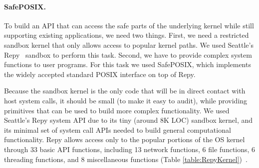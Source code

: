 \paragraph{SafePOSIX.}

To build an API that can access the safe parts of the underlying kernel while
still supporting existing applications, we need two things. First, we need a
restricted sandbox kernel that only allows access to popular kernel paths. We
used Seattle's Repy~\cite{Repy-10} sandbox to perform this task. Second, we
have to provide complex system functions to user programs.
For this task we used SafePOSIX, which implements the widely accepted standard
POSIX interface on top of Repy.

Because the sandbox kernel is the only code that will be in direct contact with host
system calls, it should be small (to make it easy to audit), while providing
primitives that can be used to build more complex functionality.
We used Seattle's Repy system API due to its tiny (around 8K LOC) sandbox
kernel, and its minimal set of system call APIs needed to build general
computational functionality. Repy allows access only to the popular portions of
the OS kernel through 33 basic API functions, including 13 network functions, 6
file functions, 6 threading functions, and 8 miscellaneous functions (Table
\ref{table:RepyKernel})~\cite{Repy-10, RepyKernel}.


